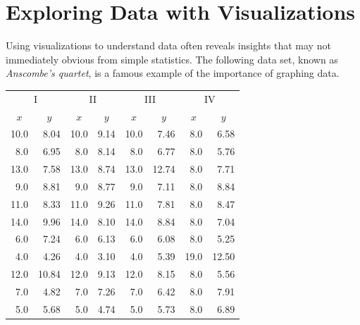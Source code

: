 \label{lab:DataVis}

\section*{Exploring Data with Visualizations} %

Using visualizations to understand data often reveals insights that may not immediately obvious from simple statistics.
The following data set, known as \emph{Anscombe's quartet}, is a famous example of the importance of graphing data.

\begin{table}[H]
\scriptsize{
\begin{tabular}{rr|rr|rr|rr}

\multicolumn{2}{c|}{I}    & \multicolumn{2}{|c|}{II} &
\multicolumn{2}{|c|}{III} & \multicolumn{2}{|c}{IV} \\
\multicolumn{1}{c}{$x$}   & \multicolumn{1}{c|}{$y$} &
\multicolumn{1}{|c}{$x$}  & \multicolumn{1}{c|}{$y$} &
\multicolumn{1}{|c}{$x$}  & \multicolumn{1}{c|}{$y$} &
\multicolumn{1}{|c}{$x$}  & \multicolumn{1}{c}{$y$} \\
\hline
10.0 & 8.04  & 10.0 & 9.14 & 10.0 & 7.46  & 8.0  & 6.58  \\
8.0  & 6.95  & 8.0  & 8.14 & 8.0  & 6.77  & 8.0  & 5.76  \\
13.0 & 7.58  & 13.0 & 8.74 & 13.0 & 12.74 & 8.0  & 7.71  \\
9.0  & 8.81  & 9.0  & 8.77 & 9.0  & 7.11  & 8.0  & 8.84  \\
11.0 & 8.33  & 11.0 & 9.26 & 11.0 & 7.81  & 8.0  & 8.47  \\
14.0 & 9.96  & 14.0 & 8.10 & 14.0 & 8.84  & 8.0  & 7.04  \\
6.0  & 7.24  & 6.0  & 6.13 & 6.0  & 6.08  & 8.0  & 5.25  \\
4.0  & 4.26  & 4.0  & 3.10 & 4.0  & 5.39  & 19.0 & 12.50 \\
12.0 & 10.84 & 12.0 & 9.13 & 12.0 & 8.15  & 8.0  & 5.56  \\
7.0  & 4.82  & 7.0  & 7.26 & 7.0  & 6.42  & 8.0  & 7.91  \\
5.0  & 5.68  & 5.0  & 4.74 & 5.0  & 5.73  & 8.0  & 6.89  \\
\end{tabular}}
\end{table}

